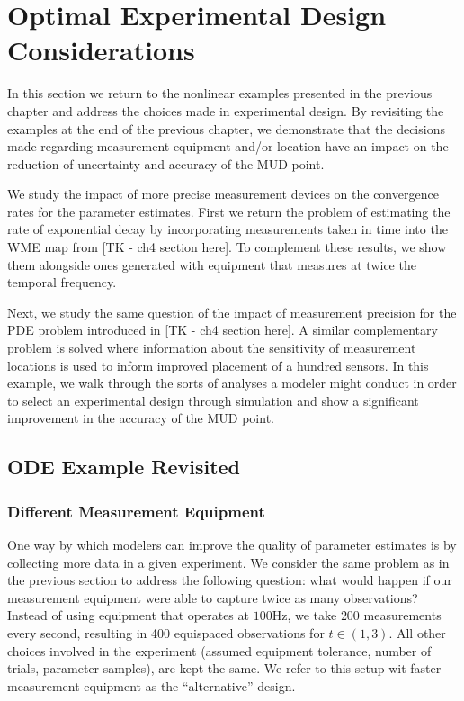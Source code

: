 \section{Optimal Experimental Design Considerations}

In this section we return to the nonlinear examples presented in the previous chapter and address the choices made in experimental design.
By revisiting the examples at the end of the previous chapter, we demonstrate that the decisions made regarding measurement equipment and/or location have an impact on the reduction of uncertainty and accuracy of the MUD point.

We study the impact of more precise measurement devices on the convergence rates for the parameter estimates.
First we return the problem of estimating the rate of exponential decay by incorporating measurements taken in time into the WME map from [TK - ch4 section here].
To complement these results, we show them alongside ones generated with equipment that measures at twice the temporal frequency.

Next, we study the same question of the impact of measurement precision for the PDE problem introduced in [TK - ch4 section here].
A similar complementary problem is solved where information about the sensitivity of measurement locations is used to inform improved placement of a hundred sensors.
In this example, we walk through the sorts of analyses a modeler might conduct in order to select an experimental design through simulation and show a significant improvement in the accuracy of the MUD point.


\subsection{ODE Example Revisited}
\FloatBarrier
\subsubsection{Different Measurement Equipment}

One way by which modelers can improve the quality of parameter estimates is by collecting more data in a given experiment.
We consider the same problem as in the previous section to address the following question: what would happen if our measurement equipment were able to capture twice as many observations?
Instead of using equipment that operates at $100$Hz, we take $200$ measurements every second, resulting in 400 equispaced observations for $t \in (1,3)$.
All other choices involved in the experiment (assumed equipment tolerance, number of trials, parameter samples), are kept the same.
We refer to this setup wit faster measurement equipment as the ``alternative'' design.

